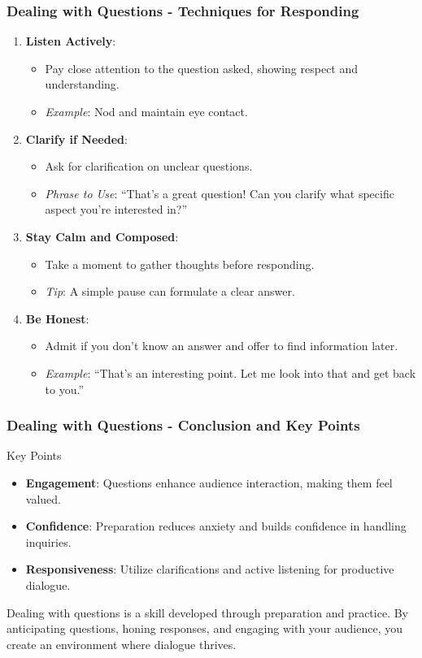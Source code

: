 \documentclass[aspectratio=169]{beamer}
\begin{document}
\begin{frame}[fragile]
    \frametitle{Dealing with Questions - Techniques for Responding}
    \begin{enumerate}
        \item \textbf{Listen Actively}:
            \begin{itemize}
                \item Pay close attention to the question asked, showing respect and understanding.
                \item \textit{Example}: Nod and maintain eye contact.
            \end{itemize}
        \item \textbf{Clarify if Needed}:
            \begin{itemize}
                \item Ask for clarification on unclear questions.
                \item \textit{Phrase to Use}: “That’s a great question! Can you clarify what specific aspect you’re interested in?”
            \end{itemize}
        \item \textbf{Stay Calm and Composed}:
            \begin{itemize}
                \item Take a moment to gather thoughts before responding.
                \item \textit{Tip}: A simple pause can formulate a clear answer.
            \end{itemize}
        \item \textbf{Be Honest}:
            \begin{itemize}
                \item Admit if you don’t know an answer and offer to find information later.
                \item \textit{Example}: “That’s an interesting point. Let me look into that and get back to you.”
            \end{itemize}
    \end{enumerate}
\end{frame}

\begin{frame}[fragile]
    \frametitle{Dealing with Questions - Conclusion and Key Points}
    \begin{block}{Key Points}
        \begin{itemize}
            \item \textbf{Engagement}: Questions enhance audience interaction, making them feel valued.
            \item \textbf{Confidence}: Preparation reduces anxiety and builds confidence in handling inquiries.
            \item \textbf{Responsiveness}: Utilize clarifications and active listening for productive dialogue.
        \end{itemize}
    \end{block}
    Dealing with questions is a skill developed through preparation and practice. By anticipating questions, honing responses, and engaging with your audience, you create an environment where dialogue thrives.
\end{frame}
\end{document}
